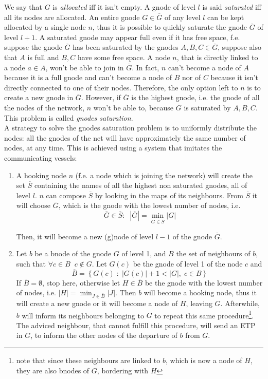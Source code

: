 \documentclass[a4paper]{article}
\newcommand{\pgra}[1]{\left\{#1\right\}}
\def\ove#1{{\overline{#1}}}
\def\0{{\emptyset}}
\begin{document}
We say that $G$ is \emph{allocated} iff it isn't empty. A gnode of level $l$ is said
\emph{saturated} iff all its nodes are allocated.
An entire gnode $G\in \ove G$ of any level $l$ can be kept allocated by a single node $n$,
thus it is possible to quickly saturate the gnode $\ove G$ of level $l+1$. 
A saturated gnode may appear full even if it has free space, f.e. suppose the
gnode $\ove G$ has been saturated by the gnodes $A,B,C \in \ove G$, suppose
also that $A$ is full and $B,C$ have some free space.
A node $n$, that is directly linked to a node $a\in A$, won't be
able to join in $\ove G$. In fact, $n$ can't become a node of $A$ because it is
a full gnode and can't become a node of $B$ nor of $C$ because it isn't directly
connected to one of their nodes. Therefore, the only option left to $n$ is to
create a new gnode in $\ove G$. However, if $\ove G$ is the highest gnode,
i.e. the gnode of all the nodes of the network, $n$ won't be able to,
because $\ove G$ is saturated by $A,B,C$. This problem is called \emph{gnodes
saturation}.\\

A strategy to solve the gnodes saturation problem is to uniformly distribute
the nodes: all the gnodes of the net will have approximately the same number
of nodes, at any time. This is achieved using a system that imitates the
communicating vessels:
\begin{enumerate}
	\item A hooking node $n$ (f.e. a node which is joining the network) will
		create the set $\ove S$ containing the names of all the
		highest non saturated gnodes, all of level $l$. $n$ can
		compose $\ove S$ by looking in the maps of its neighbours.
		From $\ove S$ it will choose $\ove G$, which is the gnode with
		the lowest number of nodes, i.e.
		\[
		\ove G \in \ove S:\;\;|\ove G| = \min_{G \in \ove S} |G|
		\]

		Then, it will become a new (g)node of level $l-1$ of the gnode $\ove G$.

	\item Let $b$ be a bnode of the gnode $G$ of level 1, and $B$ the set
	      of neighbours of $b$, such that $\forall c\in B\;\;c\notin G$.
	      Let $G(c)$ be the gnode of level 1 of the node $c$ and
	      \[
	      \ove B=\pgra{G(c)\;:\;|G(c)|+1 < |G|,\;c\in B}
	      \]
	      If $\ove B=\0$, stop here, otherwise let $H \in \ove B$ be the gnode with
	      the lowest number of nodes, i.e. $|H|=\min_{J\in \ove B} |J|$.
	      Then $b$ will become a hooking node, thus it will create a new gnode or it will become
	      a node of $H$, leaving $G$. Afterwhile, $b$ will inform its
	      neighbours belonging to $G$ to repeat this same
	      procedure\footnote{note that since these neighbours are linked
	      to $b$, which is now a node of $H$, they are also bnodes of
	      $G$, bordering with $H$}. The adviced neighbour, that cannot fulfill this
	      procedure, will send an ETP in $G$, to inform the other nodes of
	      the departure of $b$ from $G$.
\end{enumerate}
\end{document}
